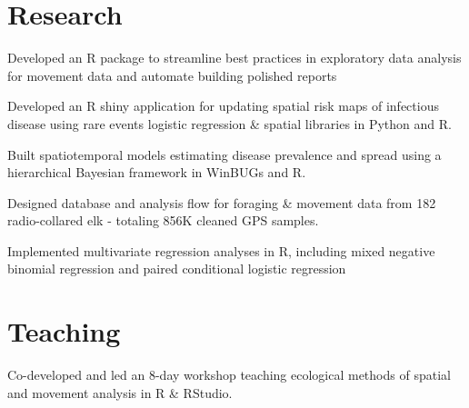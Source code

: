 \documentclass[]{deedy-resume-openfont}
\begin{document}
\begin{minipage}[t]{0.66\textwidth}

\section{Research}
\begin{tightemize}
\item Developed an R package to streamline best practices in exploratory data analysis for movement data and automate building polished reports
\item Developed an R shiny application for updating spatial risk maps of infectious disease using rare events logistic regression \& spatial libraries in Python and R. \href{https://fw-habitat-aep.shinyapps.io/ABCWD_Shiny/}{\faGlobe} \href{https://github.com/dpseidel/ABCWD_Shiny}{\faGithub}
\item Built spatiotemporal models estimating disease prevalence and spread using a hierarchical Bayesian framework in WinBUGs and R.\\
\end{tightemize}
\begin{tightemize}
\item Designed database and analysis flow for foraging \& movement data from 182 radio-collared elk - totaling 856K cleaned GPS samples.
\item Implemented multivariate regression analyses in R, including mixed negative binomial regression and paired conditional logistic regression 
\end{tightemize}
\sectionsep


\section{Teaching}
 
 Co-developed and led an 8-day workshop teaching ecological methods of spatial and movement analysis in R \& RStudio. \href{https://www.danaseidel.com/MovEco-R-Workshop/}{\faGlobe} \href{https://github.com/dpseidel/MovEco-R-Workshop/}{\faGithub} 
\vspace{4pt}


\end{minipage}
\end{document}
